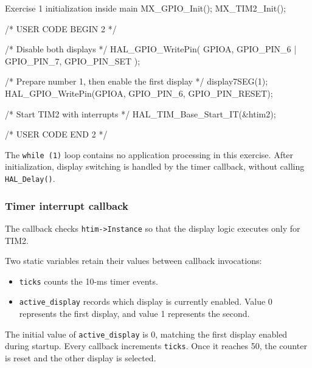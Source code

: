 \documentclass[a4paper]{article}
\begin{document}
\begin{stmcode}{Exercise 1 initialization inside main}
MX_GPIO_Init();
MX_TIM2_Init();

/* USER CODE BEGIN 2 */

/* Disable both displays */
HAL_GPIO_WritePin(
    GPIOA,
    GPIO_PIN_6 | GPIO_PIN_7,
    GPIO_PIN_SET
);

/* Prepare number 1, then enable the first display */
display7SEG(1);
HAL_GPIO_WritePin(GPIOA, GPIO_PIN_6, GPIO_PIN_RESET);

/* Start TIM2 with interrupts */
HAL_TIM_Base_Start_IT(&htim2);

/* USER CODE END 2 */
\end{stmcode}

The \texttt{while (1)} loop contains no application
processing in this exercise. After initialization,
display switching is handled by the timer callback,
without calling \texttt{HAL\_Delay()}.

\subsubsection{Timer interrupt callback}

The callback checks \texttt{htim->Instance} so that
the display logic executes only for TIM2.

Two static variables retain their values between
callback invocations:
\begin{itemize}
    \item \texttt{ticks} counts the 10-ms timer events.
    \item \texttt{active\_display} records which display
          is currently enabled. Value 0 represents
          the first display, and value 1 represents
          the second.
\end{itemize}

The initial value of \texttt{active\_display} is 0,
matching the first display enabled during startup.
Every callback increments \texttt{ticks}. Once it
reaches 50, the counter is reset and the other
display is selected.
\end{document}
